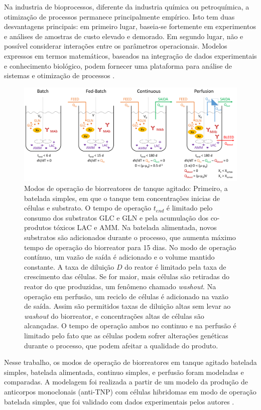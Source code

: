 \documentclass[fleqn,10pt]{SelfArx} %
\begin{document}
Na industria de bioprocessos, diferente da industria química ou petroquímica, a otimização de processos permanece principalmente empírico. Isto tem duas desvantagens principais: em primeiro lugar, baseia-se fortemente em experimentos e análises de amostras de custo elevado e demorado. Em segundo lugar, não e possível considerar interações entre os parâmetros operacionais. Modelos expressos em termos matemáticos, baseados na integração de dados experimentais e conhecimento biológico, podem fornecer uma plataforma para análise de sistemas e otimização de processos \cite{Koumpouras2012}.

\begin{figure}[ht]\centering
	\includegraphics[width=\linewidth]{operation.pdf}
	\caption{Modos de operação de biorreatores de tanque agitado: Primeiro, a batelada simples, em que o tanque tem concentrações inicias de células e substrato. O tempo de operação $t_{end}$ é limitado pelo consumo dos substratos GLC e GLN e pela acumulação dos co-produtos tóxicos LAC e AMM. Na batelada alimentada, novos substratos são adicionados durante o processo, que aumenta máximo tempo de operação do biorreator para 15 dias. No modo de operação contínuo, um vazão de saída é adicionado e o volume mantido constante. A taxa de diluição $D$ do reator é limitado pela taxa de crescimento das células. Se for maior, mais células são retiradas do reator do que produzidas, um fenômeno chamado \textit{washout}. Na operação em perfusão, um reciclo de células é adicionado na vazão de saída. Assim são permitidos taxas de diluição altas sem levar ao \textit{washout} do biorreator, e concentrações altas de células são alcançadas. O tempo de operação ambos no continuo e na perfusão é limitado pelo fato que as células podem sofrer alterações genéticas durante o processo, que podem afeitar a qualidade do produto.}
	\label{fig:operation}
\end{figure}

Nesse trabalho, os modos de operação de biorreatores em tanque agitado batelada simples, batelada alimentada, continuo simples, e perfusão foram modeladas e comparadas. A modelagem foi realizada a partir de um modelo da produção de anticorpos monoclonais (anti-TNP) com células hibridomas em modo de operação batelada simples, que foi validado com dados experimentais pelos autores \cite{Alves2008}.
\end{document}
